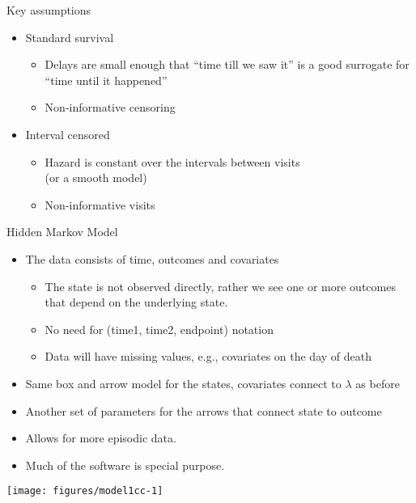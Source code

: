 \begin{frame}{Key assumptions}
  \begin{itemize}
    \item Standard survival
      \begin{itemize}
        \item Delays are small enough that ``time till we saw it'' is a good
          surrogate for ``time until it happened''
        \item Non-informative censoring
      \end{itemize}
    \item Interval censored
      \begin{itemize}
        \item Hazard is constant over the intervals between visits\\
          (or a smooth model)
        \item Non-informative visits
      \end{itemize}
  \end{itemize}
\end{frame}

\begin{frame}{Hidden Markov Model}
  \begin{itemize}
    \item  The data consists of time, outcomes and covariates
      \begin{itemize}
        \item The state is not observed directly, rather we see one or
          more outcomes that depend on the underlying state.
        \item No need for (time1, time2, endpoint) notation
        \item Data will have missing values, e.g., covariates on the day
          of death
      \end{itemize}
    \item Same box and arrow model for the states, covariates connect to
      $\lambda$ as before
    \item Another set of parameters for the arrows that connect state to outcome
    \item Allows for more episodic data.
    \item Much of the software is special purpose.
  \end{itemize}
\end{frame}

\begin{frame}
\begin{knitrout}
\color{fgcolor}
\texttt{[image: figures/model1cc-1]} 

\end{knitrout}
\end{frame}
 
